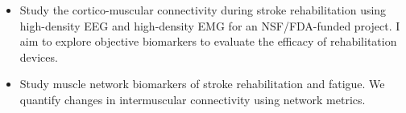 \documentclass[10pt,letter,ragged2e]{altacv}
\begin{document}

\begin{fullwidth}
\makecvheader
\end{fullwidth}



\begin{itemize}
\item Study the cortico-muscular connectivity during stroke rehabilitation using high-density EEG and high-density EMG for an NSF/FDA-funded project. I aim to explore objective biomarkers to evaluate the efficacy of rehabilitation devices.
\smallskip
\item Study muscle network biomarkers of stroke rehabilitation and fatigue. We quantify changes in intermuscular connectivity using network metrics.
\end{itemize}

\divider
\end{document}
